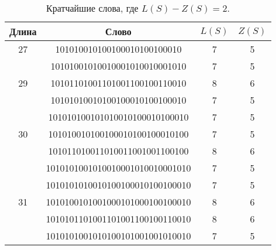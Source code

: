 \begin{table}[h]
\caption{Кратчайшие слова, где $ L(S) - Z(S) = 2 $.}
\begin{center}
\begin{tabular}{|c|c|c|c|}
\hline
Длина &
Слово &
$L(S)$ &
$Z(S)$ \\
\hline
27                  & 101010010100100010100100010 & 7 & 5 \\
\hline
\multirow{3}{*}{29} & 10101001010010001010010001010 & 7 & 5 \\
                    & 10101101001101001100100110010 & 8 & 6 \\
                    & 10101010010100100010100100010 & 7 & 5 \\
\hline
\multirow{3}{*}{30} & 101010100101010010100010100010 & 7 & 5 \\
                    & 101010010100100010100100010100 & 7 & 5 \\
                    & 101011010011010011001001100100 & 8 & 6 \\
\hline
\multirow{5}{*}{31} & 1010101001010010001010010001010 & 7 & 5 \\
                    & 1010101010010100100010100100010 & 7 & 5 \\
                    & 1010100101001000101000100100010 & 8 & 6 \\
                    & 1010101101001101001100100110010 & 8 & 6 \\
                    & 1010101001010100101001001010010 & 7 & 5 \\
\hline
\end{tabular}
\end{center}
\end{table}

